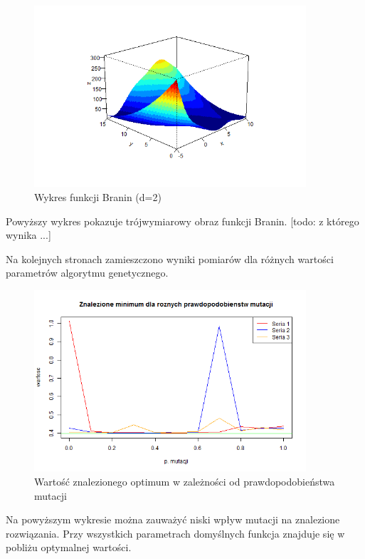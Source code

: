 \documentclass[11pt, a4paper]{article}
\newcommand{\fbi}{\leavevmode{\parindent=1em\indent}}
\begin{document}
\begin{figure}[H]
	\centering
	\includegraphics[width=0.9\textwidth]{./assets/Branin1.png}
	\caption{Wykres funkcji Branin (d=2)}
	\label{fig:branin1}
\end{figure}

\fbi
Powyższy wykres pokazuje trójwymiarowy obraz funkcji Branin.
[todo: z którego wynika ...]

\fbi
Na kolejnych stronach zamieszczono wyniki pomiarów dla różnych wartości parametrów algorytmu genetycznego.

\begin{figure}[H]
	\centering
	\includegraphics[width=0.9\textwidth]{./assets/Branin2.png}
	\caption{Wartość znalezionego optimum w zależności od prawdopodobieństwa mutacji}
	\label{fig:branin2}
\end{figure}

\fbi
Na powyższym wykresie można zauważyć niski wpływ mutacji na znalezione rozwiązania. Przy wszystkich parametrach domyślnych funkcja znajduje się w pobliżu optymalnej wartości.
\end{document}
